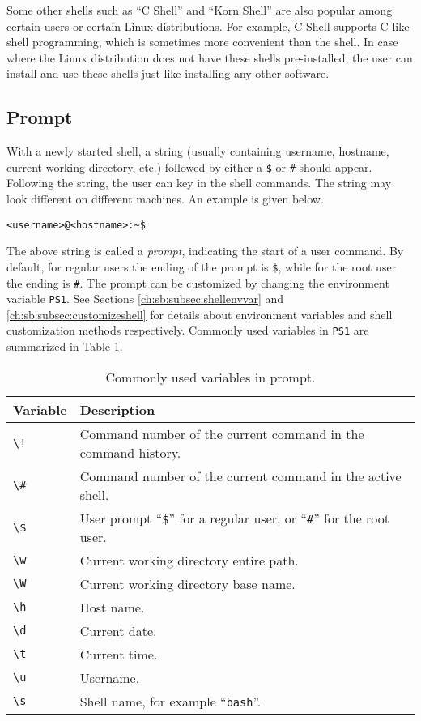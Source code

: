 Some other shells such as ``C Shell'' and ``Korn Shell'' are also popular among certain users or certain Linux distributions. For example, C Shell supports C-like shell programming, which is sometimes more convenient than the shell. In case where the Linux distribution does not have these shells pre-installed, the user can install and use these shells just like installing any other software.

\subsection{Prompt}

With a newly started shell, a string (usually containing username, hostname, current working directory, etc.) followed by either a \verb|$| or \verb|#| should appear. Following the string, the user can key in the shell commands. The string may look different on different machines. An example is given below.
\begin{lstlisting}
<username>@<hostname>:~$
\end{lstlisting}

The above string is called a \textit{prompt}, indicating the start of a user command. By default, for regular users the ending of the prompt is \verb|$|, while for the root user the ending is \verb|#|. The prompt can be customized by changing the environment variable \verb|PS1|. See Sections \ref{ch:sb:subsec:shellenvvar} and \ref{ch:sb:subsec:customizeshell} for details about environment variables and shell customization methods respectively. Commonly used variables in \verb|PS1| are summarized in Table \ref{ch:sb:tab:promptvariable}.

\begin{table}
	\centering \caption{Commonly used variables in prompt.}\label{ch:sb:tab:promptvariable}
	\begin{tabularx}{\textwidth}{lX}
		\hline
		Variable & Description \\ \hline
		\verb|\!| & Command number of the current command in the command history. \\ 
		\verb|\#| & Command number of the current command in the active shell. \\ 
		\verb|\$| & User prompt ``\verb|$|'' for a regular user, or ``\verb|#|'' for the root user. \\
		\verb|\w| & Current working directory entire path. \\ 
		\verb|\W| & Current working directory base name. \\ 
		\verb|\h| & Host name. \\ 
		\verb|\d| & Current date. \\ 
		\verb|\t| & Current time. \\ 
		\verb|\u| & Username. \\ 
		\verb|\s| & Shell name, for example ``\verb|bash|''. \\ 
		\hline
	\end{tabularx}
\end{table}


